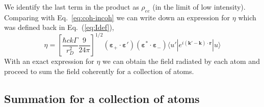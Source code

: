 \documentclass[11pt,letter]{article}
\newcommand{\bv}[1]{\ensuremath{\bm{#1}}}
\begin{document}
We identify the last term in the product as $\rho_{ee}$ (in the limit of low
intensity). Comparing with Eq.~\ref{eq:coh-incoh} we can write down an
expression for $\eta$ which was defined back in Eq.~(\ref{eq:Idef}), 
\begin{equation}
  \eta = \left[ \frac{\hbar c k \Gamma}{r_{D}^{2}}  
    \frac{9}{24\pi} \right]^{1/2} 
        (\bv{\varepsilon}_{+}\cdot \bv{\varepsilon}' )
                       (\bv{\varepsilon}^{*}\cdot \bv{\varepsilon}_{-} ) 
      \langle u' | e^{i(\bv{k}'-\bv{k}) \cdot\bv{r}} | u  \rangle
\end{equation}
With an exact expression for $\eta$ we can obtain the field radiated by each
atom and proceed to sum the field coherently for a collection of atoms. 

\subsection{Summation for a collection of atoms} 
\end{document}
